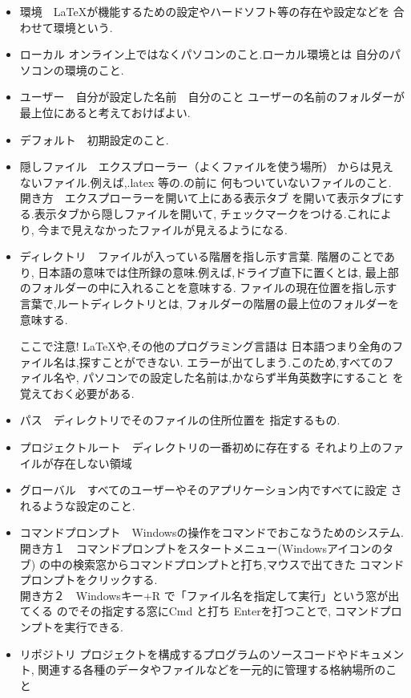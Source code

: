 \documentclass{ltjsarticle}
\begin{document}
\begin{itemize}
  \item 環境　\LaTeX が機能するための設定やハードソフト等の存在や設定などを
        合わせて環境という.
  \item ローカル  オンライン上ではなくパソコンのこと.ローカル環境とは
        自分のパソコンの環境のこと.
  \item ユーザー　自分が設定した名前　自分のこと
        ユーザーの名前のフォルダーが最上位にあると考えておけばよい.
  \item デフォルト　初期設定のこと.
  \item 隠しファイル　エクスプローラー（よくファイルを使う場所）
        からは見えないファイル.例えば,.latex 等の.の前に
        何もついていないファイルのこと.
        開き方　エクスプローラーを開いて上にある表示タブ
        を開いて表示タブにする.表示タブから隠しファイルを開いて,
        チェックマークをつける.これにより,
        今まで見えなかったファイルが見えるようになる.

  \item ディレクトリ　ファイルが入っている階層を指し示す言葉.
        階層のことであり,
        日本語の意味では住所録の意味.例えば,ドライブ直下に置くとは,
        最上部のフォルダーの中に入れることを意味する.
        ファイルの現在位置を指し示す言葉で,ルートディレクトリとは,
        フォルダーの階層の最上位のフォルダーを意味する.


        ここで注意! LaTeXや,その他のプログラミング言語は
        日本語つまり全角のファイル名は,探すことができない.
        エラーが出てしまう.このため,すべてのファイル名や,
        パソコンでの設定した名前は,かならず半角英数字にすること
        を覚えておく必要がある.
  \item パス　ディレクトリでそのファイルの住所位置を
        指定するもの.
  \item プロジェクトルート　ディレクトリの一番初めに存在する
        それより上のファイルが存在しない領域
  \item グローバル　すべてのユーザーやそのアプリケーション内ですべてに設定
        されるような設定のこと.
  \item コマンドプロンプト　Windowsの操作をコマンドでおこなうためのシステム.\\
        開き方１　コマンドプロンプトをスタートメニュー(Windowsアイコンのタブ)
        の中の検索窓からコマンドプロンプトと打ち,マウスで出てきた
        コマンドプロンプトをクリックする.\\
        開き方２　Windowsキー+R で「ファイル名を指定して実行」という窓が出てくる
        のでその指定する窓にCmd と打ち Enterを打つことで,
        コマンドプロンプトを実行できる.
  \item リポジトリ
        プロジェクトを構成するプログラムのソースコードやドキュメント,
         関連する各種のデータやファイルなどを一元的に管理する格納場所のこと

\end{itemize}
\end{document}

